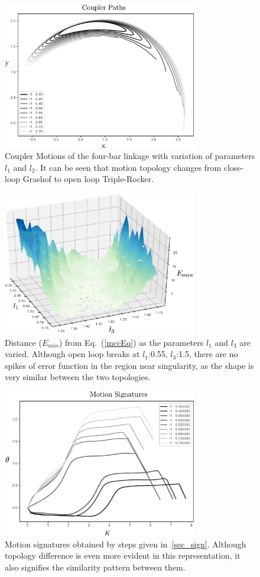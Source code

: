 \documentclass[twocolumn,10pt]{asme2ej}
\newcommand{\req}[1]{(\ref{#1})}
\begin{document}
\begin{figure}
\centering
\includegraphics[width=240pt]{figure/fig_sa_coupler_curves.eps}
  \caption{Coupler Motions of the four-bar linkage with variation of parameters $l_1$ and $l_2$. It can be seen that motion topology changes from close-loop Grashof to open loop Triple-Rocker.}
\label{saCouplerCurves}
\end{figure}

\begin{figure}
\centering
\includegraphics[width=240pt]{figure/fig_sa_distance_function.eps}
  \caption{Distance ($E_{min}$) from Eq.~\req{mccEq} as the parameters $l_1$ and $l_3$ are varied. Although open loop breaks at $l_1$:0.55, $l_3$:1.5, there are no spikes of error function in the region near singularity, as the shape is very similar between the two topologies.}
\label{saErrorFunction}
\end{figure}

\begin{figure}
\centering
\includegraphics[width=240pt]{figure/fig_sa_motion_signatures.eps}
  \caption{Motion signatures obtained by steps given in~\ref{sec_sign}. Although topology difference is even more evident in this representation, it also signifies the similarity pattern between them.}
\label{saMotionSignatures}
\end{figure}
\end{document}
